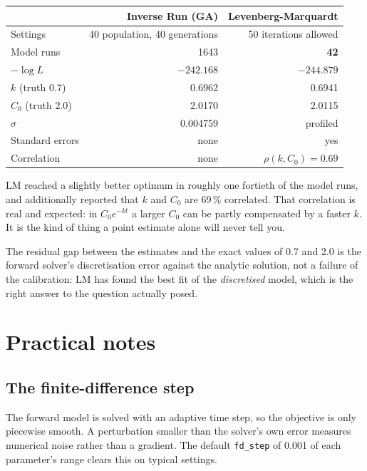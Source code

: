 \documentclass[11pt,a4paper]{article}
\newcommand{\code}[1]{\texttt{\small #1}}
\begin{document}
\begin{center}
\begin{tabular}{@{}lrr@{}}
\toprule
 & \textbf{Inverse Run (GA)} & \textbf{Levenberg-Marquardt} \\
\midrule
Settings          & 40 population, 40 generations & 50 iterations allowed \\
Model runs        & 1643 & \textbf{42} \\
$-\log L$         & $-242.168$ & $\mathbf{-244.879}$ \\
$k$ (truth 0.7)   & 0.6962 & 0.6941 \\
$C_0$ (truth 2.0) & 2.0170 & 2.0115 \\
$\sigma$          & 0.004759 & profiled \\
Standard errors   & none & yes \\
Correlation       & none & $\rho(k,C_0) = 0.69$ \\
\bottomrule
\end{tabular}
\end{center}

LM reached a slightly better optimum in roughly one fortieth of the model runs,
and additionally reported that $k$ and $C_0$ are 69\,\% correlated. That
correlation is real and expected: in $C_0 e^{-kt}$ a larger $C_0$ can be partly
compensated by a faster $k$. It is the kind of thing a point estimate alone
will never tell you.

The residual gap between the estimates and the exact values of 0.7 and 2.0 is
the forward solver's discretisation error against the analytic solution, not a
failure of the calibration: LM has found the best fit of the \emph{discretised}
model, which is the right answer to the question actually posed.

\section{Practical notes}

\subsection{The finite-difference step}\label{sec:fdstep}

The forward model is solved with an adaptive time step, so the objective is only
piecewise smooth. A perturbation smaller than the solver's own error measures
numerical noise rather than a gradient. The default \code{fd\_step} of 0.001 of
each parameter's range clears this on typical settings.
\end{document}
